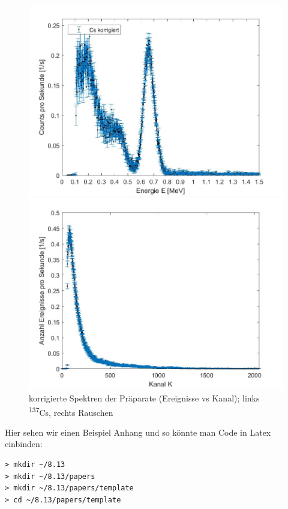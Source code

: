 \documentclass[aps,twocolumn,secnumarabic,nobalancelastpage,amsmath,amssymb,
nofootinbib,superscriptaddress]{revtex4-1}
\begin{document}
\begin{figure}[t]
  \begin{minipage}[t]{0.49\textwidth}
    \includegraphics[width=\textwidth]{../Messung/CsK.jpg}
  \end{minipage}
  \begin{minipage}[t]{0.49\textwidth}
    \includegraphics[width=\textwidth]{../Messung/Rauschen.jpg}
  \end{minipage}
  \caption{\label{fig:spektrenK2} korrigierte Spektren der Präparate (Ereignisse vs Kanal); links \textsuperscript{137}Cs, rechts Rauschen}
\end{figure}

Hier sehen wir einen Beispiel Anhang und so könnte man Code in Latex einbinden:
\begin{verbatim}
> mkdir ~/8.13
> mkdir ~/8.13/papers
> mkdir ~/8.13/papers/template
> cd ~/8.13/papers/template
\end{verbatim}


\end{document}
